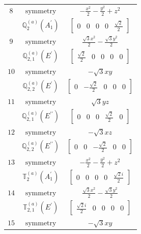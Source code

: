\documentclass[fleqn,8pt,landscape]{jsarticle}
\begin{document}
\begin{longtable}{ccc}
$ 8 $ & $ \text{symmetry} $ & $ - \frac{x^{2}}{2} - \frac{y^{2}}{2} + z^{2} $ \\
$  $ & $ \mathbb{Q}_{2}^{(a)}(A_{1}^{\prime}) $ & $ \begin{bmatrix} 0 & 0 & 0 & 0 & \frac{\sqrt{2}}{2} \end{bmatrix} $ \\ \hline
$ 9 $ & $ \text{symmetry} $ & $ \frac{\sqrt{3} x^{2}}{2} - \frac{\sqrt{3} y^{2}}{2} $ \\
$  $ & $ \mathbb{Q}_{2,1}^{(a)}(E^{\prime}) $ & $ \begin{bmatrix} \frac{\sqrt{2}}{2} & 0 & 0 & 0 & 0 \end{bmatrix} $ \\ \hline
$ 10 $ & $ \text{symmetry} $ & $ - \sqrt{3} x y $ \\
$  $ & $ \mathbb{Q}_{2,2}^{(a)}(E^{\prime}) $ & $ \begin{bmatrix} 0 & - \frac{\sqrt{2}}{2} & 0 & 0 & 0 \end{bmatrix} $ \\ \hline
$ 11 $ & $ \text{symmetry} $ & $ \sqrt{3} y z $ \\
$  $ & $ \mathbb{Q}_{2,1}^{(a)}(E^{\prime\prime}) $ & $ \begin{bmatrix} 0 & 0 & 0 & \frac{\sqrt{2}}{2} & 0 \end{bmatrix} $ \\ \hline
$ 12 $ & $ \text{symmetry} $ & $ - \sqrt{3} x z $ \\
$  $ & $ \mathbb{Q}_{2,2}^{(a)}(E^{\prime\prime}) $ & $ \begin{bmatrix} 0 & 0 & - \frac{\sqrt{2}}{2} & 0 & 0 \end{bmatrix} $ \\ \hline
$ 13 $ & $ \text{symmetry} $ & $ - \frac{x^{2}}{2} - \frac{y^{2}}{2} + z^{2} $ \\
$  $ & $ \mathbb{T}_{2}^{(a)}(A_{1}^{\prime}) $ & $ \begin{bmatrix} 0 & 0 & 0 & 0 & \frac{\sqrt{2} i}{2} \end{bmatrix} $ \\ \hline
$ 14 $ & $ \text{symmetry} $ & $ \frac{\sqrt{3} x^{2}}{2} - \frac{\sqrt{3} y^{2}}{2} $ \\
$  $ & $ \mathbb{T}_{2,1}^{(a)}(E^{\prime}) $ & $ \begin{bmatrix} \frac{\sqrt{2} i}{2} & 0 & 0 & 0 & 0 \end{bmatrix} $ \\ \hline
$ 15 $ & $ \text{symmetry} $ & $ - \sqrt{3} x y $ \\

\end{longtable}
\end{document}
